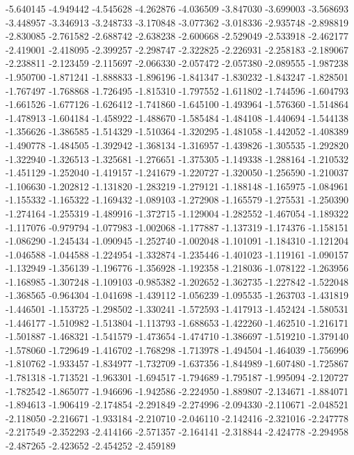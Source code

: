 -5.640145
-4.949442
-4.545628
-4.262876
-4.036509
-3.847030
-3.699003
-3.568693
-3.448957
-3.346913
-3.248733
-3.170848
-3.077362
-3.018336
-2.935748
-2.898819
-2.830085
-2.761582
-2.688742
-2.638238
-2.600668
-2.529049
-2.533918
-2.462177
-2.419001
-2.418095
-2.399257
-2.298747
-2.322825
-2.226931
-2.258183
-2.189067
-2.238811
-2.123459
-2.115697
-2.066330
-2.057472
-2.057380
-2.089555
-1.987238
-1.950700
-1.871241
-1.888833
-1.896196
-1.841347
-1.830232
-1.843247
-1.828501
-1.767497
-1.768868
-1.726495
-1.815310
-1.797552
-1.611802
-1.744596
-1.604793
-1.661526
-1.677126
-1.626412
-1.741860
-1.645100
-1.493964
-1.576360
-1.514864
-1.478913
-1.604184
-1.458922
-1.488670
-1.585484
-1.484108
-1.440694
-1.544138
-1.356626
-1.386585
-1.514329
-1.510364
-1.320295
-1.481058
-1.442052
-1.408389
-1.490778
-1.484505
-1.392942
-1.368134
-1.316957
-1.439826
-1.305535
-1.292820
-1.322940
-1.326513
-1.325681
-1.276651
-1.375305
-1.149338
-1.288164
-1.210532
-1.451129
-1.252040
-1.419157
-1.241679
-1.220727
-1.320050
-1.256590
-1.210037
-1.106630
-1.202812
-1.131820
-1.283219
-1.279121
-1.188148
-1.165975
-1.084961
-1.155332
-1.165322
-1.169432
-1.089103
-1.272908
-1.165579
-1.275531
-1.250390
-1.274164
-1.255319
-1.489916
-1.372715
-1.129004
-1.282552
-1.467054
-1.189322
-1.117076
-0.979794
-1.077983
-1.002068
-1.177887
-1.137319
-1.174376
-1.158151
-1.086290
-1.245434
-1.090945
-1.252740
-1.002048
-1.101091
-1.184310
-1.121204
-1.046588
-1.044588
-1.224954
-1.332874
-1.235446
-1.401023
-1.119161
-1.090157
-1.132949
-1.356139
-1.196776
-1.356928
-1.192358
-1.218036
-1.078122
-1.263956
-1.168985
-1.307248
-1.109103
-0.985382
-1.202652
-1.362735
-1.227842
-1.522048
-1.368565
-0.964304
-1.041698
-1.439112
-1.056239
-1.095535
-1.263703
-1.431819
-1.446501
-1.153725
-1.298502
-1.330241
-1.572593
-1.417913
-1.452424
-1.580531
-1.446177
-1.510982
-1.513804
-1.113793
-1.688653
-1.422260
-1.462510
-1.216171
-1.501887
-1.468321
-1.541579
-1.473654
-1.474710
-1.386697
-1.519210
-1.379140
-1.578060
-1.729649
-1.416702
-1.768298
-1.713978
-1.494504
-1.464039
-1.756996
-1.810762
-1.933457
-1.834977
-1.732709
-1.637356
-1.844989
-1.607480
-1.725867
-1.781318
-1.713521
-1.963301
-1.694517
-1.794689
-1.795187
-1.995094
-2.120727
-1.782542
-1.865077
-1.946696
-1.942586
-2.224950
-1.889807
-2.134671
-1.884071
-1.894613
-1.906419
-2.174854
-2.291849
-2.274996
-2.094330
-2.110671
-2.048521
-2.118050
-2.216671
-1.933184
-2.210710
-2.046110
-2.142416
-2.321016
-2.247778
-2.217549
-2.352293
-2.414166
-2.571357
-2.164141
-2.318844
-2.424778
-2.294958
-2.487265
-2.423652
-2.454252
-2.459189
